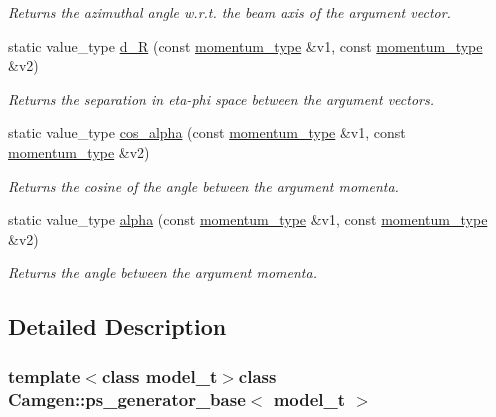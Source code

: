 \begin{DoxyCompactItemize}
\begin{DoxyCompactList}\small\item\em Returns the azimuthal angle w.\+r.\+t. the beam axis of the argument vector. \end{DoxyCompactList}\item 
\hypertarget{a00451_aa01f45e3c5cbd9e10a7e182310a00dd1}{}static value\+\_\+type \hyperlink{a00451_aa01f45e3c5cbd9e10a7e182310a00dd1}{d\+\_\+\+R} (const \hyperlink{a00579}{momentum\+\_\+type} \&v1, const \hyperlink{a00579}{momentum\+\_\+type} \&v2)\label{a00451_aa01f45e3c5cbd9e10a7e182310a00dd1}

\begin{DoxyCompactList}\small\item\em Returns the separation in eta-\/phi space between the argument vectors. \end{DoxyCompactList}\item 
\hypertarget{a00451_a9a0a8bff777a6427543d5a2d27c297c6}{}static value\+\_\+type \hyperlink{a00451_a9a0a8bff777a6427543d5a2d27c297c6}{cos\+\_\+alpha} (const \hyperlink{a00579}{momentum\+\_\+type} \&v1, const \hyperlink{a00579}{momentum\+\_\+type} \&v2)\label{a00451_a9a0a8bff777a6427543d5a2d27c297c6}

\begin{DoxyCompactList}\small\item\em Returns the cosine of the angle between the argument momenta. \end{DoxyCompactList}\item 
\hypertarget{a00451_ad2e9ce507c31c79eaec49202c3bacfd8}{}static value\+\_\+type \hyperlink{a00451_ad2e9ce507c31c79eaec49202c3bacfd8}{alpha} (const \hyperlink{a00579}{momentum\+\_\+type} \&v1, const \hyperlink{a00579}{momentum\+\_\+type} \&v2)\label{a00451_ad2e9ce507c31c79eaec49202c3bacfd8}

\begin{DoxyCompactList}\small\item\em Returns the angle between the argument momenta. \end{DoxyCompactList}\end{DoxyCompactItemize}


\subsection{Detailed Description}
\subsubsection*{template$<$class model\+\_\+t$>$class Camgen\+::ps\+\_\+generator\+\_\+base$<$ model\+\_\+t $>$}

